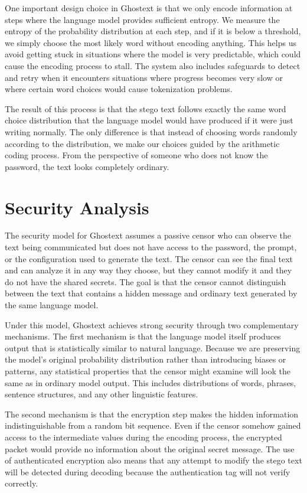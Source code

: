 \documentclass[sigconf,review,anonymous]{acmart}
\begin{document}
{One important design choice in Ghostext is that we only encode information at steps where the language model provides sufficient entropy. We measure the entropy of the probability distribution at each step, and if it is below a threshold, we simply choose the most likely word without encoding anything. This helps us avoid getting stuck in situations where the model is very predictable, which could cause the encoding process to stall. The system also includes safeguards to detect and retry when it encounters situations where progress becomes very slow or where certain word choices would cause tokenization problems.

The result of this process is that the stego text follows exactly the same word choice distribution that the language model would have produced if it were just writing normally. The only difference is that instead of choosing words randomly according to the distribution, we make our choices guided by the arithmetic coding process. From the perspective of someone who does not know the password, the text looks completely ordinary.

\section{Security Analysis}

The security model for Ghostext assumes a passive censor who can observe the text being communicated but does not have access to the password, the prompt, or the configuration used to generate the text. The censor can see the final text and can analyze it in any way they choose, but they cannot modify it and they do not have the shared secrets. The goal is that the censor cannot distinguish between the text that contains a hidden message and ordinary text generated by the same language model.

Under this model, Ghostext achieves strong security through two complementary mechanisms. The first mechanism is that the language model itself produces output that is statistically similar to natural language. Because we are preserving the model's original probability distribution rather than introducing biases or patterns, any statistical properties that the censor might examine will look the same as in ordinary model output. This includes distributions of words, phrases, sentence structures, and any other linguistic features.

The second mechanism is that the encryption step makes the hidden information indistinguishable from a random bit sequence. Even if the censor somehow gained access to the intermediate values during the encoding process, the encrypted packet would provide no information about the original secret message. The use of authenticated encryption also means that any attempt to modify the stego text will be detected during decoding because the authentication tag will not verify correctly.

}
\end{document}
